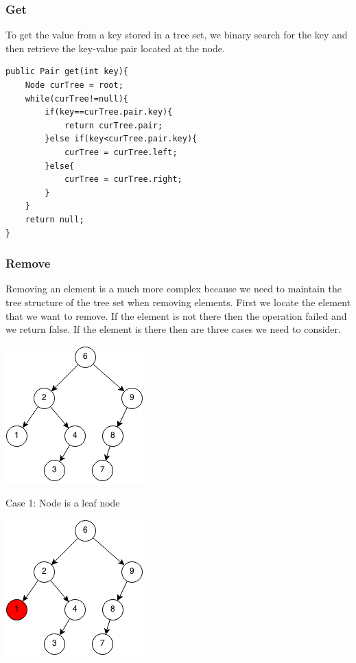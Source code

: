 \documentclass[11pt,oneside]{book}
\makeatletter
\def\maxwidth#1{\ifdim\Gin@nat@width>#1 #1\else\Gin@nat@width\fi}
\makeatother
\begin{document}
\subsubsection{Get}

To get the value from a key stored in a tree set, we binary search for the key and then retrieve the key-value pair located at the node.

\begin{lstlisting}
public Pair get(int key){
    Node curTree = root;
    while(curTree!=null){
        if(key==curTree.pair.key){
            return curTree.pair;
        }else if(key<curTree.pair.key){
            curTree = curTree.left;
        }else{
            curTree = curTree.right;
        }
    }
    return null;
}
\end{lstlisting}

\subsubsection{Remove}

Removing an element is a much more complex because we need to maintain the tree structure of the tree set when removing elements. First we locate the element that we want to remove. If the element is not there then the operation failed and we return false. If the element is there then are three cases we need to consider.

\includegraphics[width=\maxwidth{\textwidth}]{bst-rem.png}

Case 1: Node is a leaf node

\includegraphics[width=\maxwidth{\textwidth}]{bst-rem-case11.png}
\end{document}

